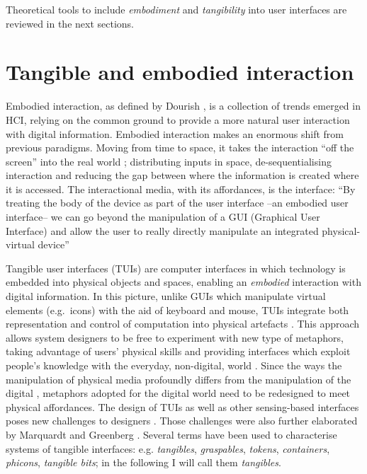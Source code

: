 Theoretical tools to include \emph{embodiment} and \emph{tangibility} into user interfaces are reviewed in the next sections.

\section{Tangible and embodied interaction}\label{tangible-interfaces-and-embodied-interaction}

Embodied interaction, as defined by Dourish \autocite{Dourish:2001vc}, is a collection of trends emerged in HCI, relying on the common ground to provide a more natural user interaction with digital information. Embodied interaction makes an enormous shift from previous paradigms. Moving from time to space, it takes the interaction ``off the screen'' into the real world \autocite{Dourish:2001vc}; distributing inputs in space, de-sequentialising interaction and reducing the gap between where the information is created where it is accessed. The interactional media, with its affordances, is the interface: ``By treating the body of the device as part of the user interface --an embodied user interface-- we can go beyond the manipulation of a GUI (Graphical User Interface) and allow the user to really directly manipulate an integrated physical-virtual device'' \autocite{Fishkin:2000df}

Tangible user interfaces (TUIs) are computer interfaces in which technology is embedded into physical objects and spaces, enabling an \emph{embodied} interaction with digital information. In this picture, unlike GUIs which manipulate virtual elements (e.g.~icons) with the aid of keyboard and mouse, TUIs integrate both representation and control of computation into physical artefacts \autocite{krumm2009ubiquitous}. This approach allows system designers to be free to experiment with new type of metaphors, taking advantage of users' physical skills and providing interfaces which exploit people's knowledge with the everyday, non-digital, world \autocite{Jacob:2008vm}. Since the ways the manipulation of physical media profoundly differs from the manipulation of the digital \autocite{Terrenghi:2007uv}, metaphors adopted for the digital world need to be redesigned to meet physical affordances. The design of TUIs as well as other sensing-based interfaces poses new challenges to designers \autocite{Bellotti:2002wg}. Those challenges were also further elaborated by Marquardt and Greenberg \autocite*{Marquardt:2012tg}. Several terms have been used to characterise systems of tangible interfaces: e.g. \emph{tangibles}, \emph{graspables}, \emph{tokens}, \emph{containers}, \emph{phicons}, \emph{tangible bits}; in the following I will call them \emph{tangibles}.

